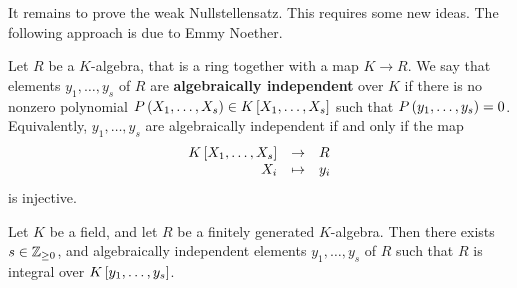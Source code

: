 It remains to prove the weak Nullstellensatz. This requires some new ideas. The following approach is due to Emmy Noether.

\begin{definition}
Let $ R $ be a $ K $-algebra, that is a ring together with a map $ K \to R $. We say that elements $ y_1, \dots, y_s $ of $ R $ are \textbf{algebraically independent} over $ K $ if there is no nonzero polynomial $ P\rb{X_1, \dots, X_s} \in K\sb{X_1, \dots, X_s} $ such that $ P\rb{y_1, \dots, y_s} = 0 $. Equivalently, $ y_1, \dots, y_s $ are algebraically independent if and only if the map
$$ \function{K\sb{X_1, \dots, X_s}}{R}{X_i}{y_i} $$
is injective.
\end{definition}

\begin{proposition}
Let $ K $ be a field, and let $ R $ be a finitely generated $ K $-algebra. Then there exists $ s \in \Z_{\ge 0} $, and algebraically independent elements $ y_1, \dots, y_s $ of $ R $ such that $ R $ is integral over $ K\sb{y_1, \dots, y_s} $.
\end{proposition}

